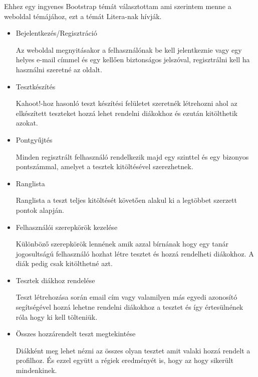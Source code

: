 Ehhez egy ingyenes Bootstrap témát választottam ami szerintem menne a weboldal témájához, ezt a témát Litera-nak\cite{litera} hívják.


\begin{itemize}
    \item {Bejelentkezés/Regisztráció}
          \begin{addmargin}[\parindent]{0pt}
              Az weboldal megnyitásakor a felhasználónak be kell jelentkeznie vagy egy helyes e-mail címmel és egy kellően biztonságos jelszóval, regisztrálni kell ha használni szeretné az oldalt.
          \end{addmargin}
    \item {Tesztkészítés}
          \begin{addmargin}[\parindent]{0pt}
              Kahoot!-hoz hasonló teszt készítési felületet szeretnék létrehozni ahol az elkészített teszteket hozzá lehet rendelni diákokhoz és ezután kitölthetik azokat.
          \end{addmargin}
    \item {Pontgyűjtés}
          \begin{addmargin}[\parindent]{0pt}
              Minden regisztrált felhasználó rendelkezik majd egy szinttel és egy bizonyos pontszámmal, amelyet a tesztek kitöltésével szerezhetnek.
          \end{addmargin}
    \item {Ranglista}
          \begin{addmargin}[\parindent]{0pt}
              Ranglista a teszt teljes kitöltését követően alakul ki a legtöbbet szerzett pontok alapján.
          \end{addmargin}
    \item {Felhasználói szerepkörök kezelése}
          \begin{addmargin}[\parindent]{0pt}
              Különböző szerepkörök lennének amik azzal bírnának hogy egy tanár jogosultságú felhasználó hozhat létre tesztet és hozzá rendelheti diákokhoz. A diák pedig csak kitölthetné azt.
          \end{addmargin}
    \item {Tesztek diákhoz rendelése}
          \begin{addmargin}[\parindent]{0pt}
              Teszt létrehozása során email cím vagy valamilyen más egyedi azonosító segítségével hozzá lehetne rendelni diákokhoz a tesztet és így értesülnének róla hogy ki kell tölteniük.
          \end{addmargin}
    \item {Összes hozzárendelt teszt megtekintése}
          \begin{addmargin}[\parindent]{0pt}
              Diákként meg lehet nézni az összes olyan tesztet amit valaki hozzá rendelt a profilhoz. És ezzel együtt a régiek eredményét is, hogy az hogy sikerült mindenkinek.
          \end{addmargin}
\end{itemize}

